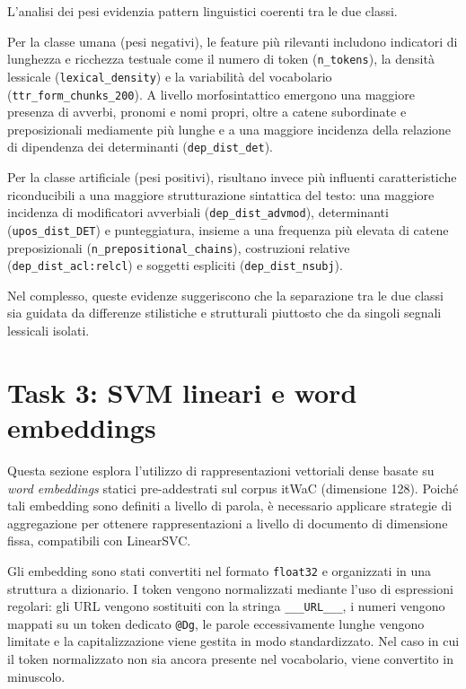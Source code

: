 \documentclass{article}
\begin{document}
L'analisi dei pesi evidenzia pattern linguistici coerenti tra le due classi.

Per la classe umana (pesi negativi), le feature più rilevanti includono indicatori di lunghezza e ricchezza testuale come il numero di token (\texttt{n\_tokens}), la densità lessicale (\texttt{lexical\_density}) e la variabilità del vocabolario (\texttt{ttr\_form\_chunks\_200}). A livello morfosintattico emergono una maggiore presenza di avverbi, pronomi e nomi propri, oltre a catene subordinate e preposizionali mediamente più lunghe e a una maggiore incidenza della relazione di dipendenza dei determinanti (\texttt{dep\_dist\_det}).

Per la classe artificiale (pesi positivi), risultano invece più influenti caratteristiche riconducibili a una maggiore strutturazione sintattica del testo: una maggiore incidenza di modificatori avverbiali (\texttt{dep\_dist\_advmod}), determinanti (\texttt{upos\_dist\_DET}) e punteggiatura, insieme a una frequenza più elevata di catene preposizionali (\texttt{n\_prepositional\_chains}), costruzioni relative (\texttt{dep\_dist\_acl:relcl}) e soggetti espliciti (\texttt{dep\_dist\_nsubj}).

Nel complesso, queste evidenze suggeriscono che la separazione tra le due classi 
sia guidata da differenze stilistiche e strutturali piuttosto che da singoli 
segnali lessicali isolati.


\section{Task 3: SVM lineari e word embeddings}

Questa sezione esplora l’utilizzo di rappresentazioni vettoriali dense basate su \textit{word embeddings} statici pre-addestrati sul corpus itWaC (dimensione 128). Poiché tali embedding sono definiti a livello di parola, è necessario applicare strategie di aggregazione per ottenere rappresentazioni a livello di documento di dimensione fissa, compatibili con LinearSVC.

Gli embedding sono stati convertiti nel formato \texttt{float32} e organizzati in una struttura a dizionario. I token vengono normalizzati mediante l’uso di espressioni regolari: gli URL vengono sostituiti con la stringa \texttt{\_\_\_URL\_\_\_}, i numeri vengono mappati su un token dedicato \texttt{@Dg}, le parole eccessivamente lunghe vengono limitate e la capitalizzazione viene gestita in modo standardizzato. Nel caso in cui il token normalizzato non sia ancora presente nel vocabolario, viene convertito in minuscolo.
\end{document}
